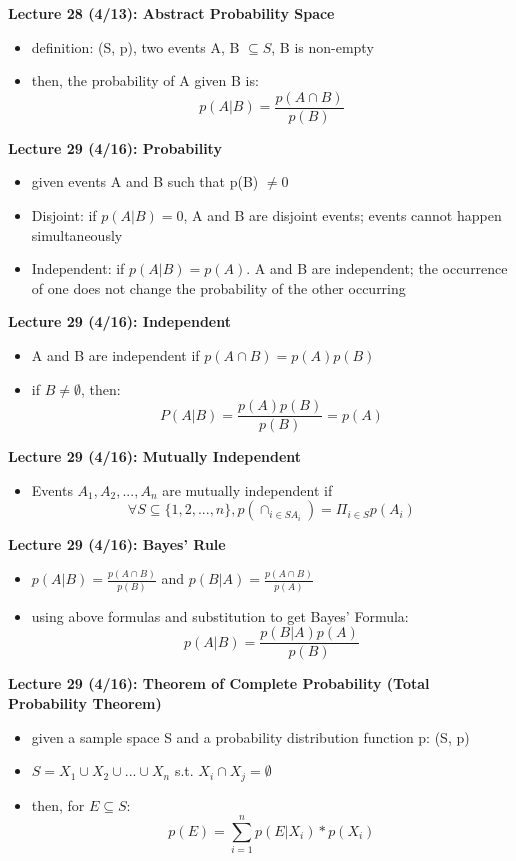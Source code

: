 \documentclass[twocolumn]{article}
\begin{document}
\textbf{Lecture 28 (4/13): Abstract Probability Space}
\begin{itemize}
    \item definition: (S, p), two events A, B $\subseteq S$, B is non-empty
    \item then, the probability of A given B is: 
    $$p(A | B) = \frac{p(A\cap B)}{p(B)}$$
\end{itemize}

\textbf{Lecture 29 (4/16): Probability}
\begin{itemize}
    \item given events A and B such that p(B) $\neq 0$
    \item Disjoint: if $p(A|B)=0$, A and B are disjoint events; events cannot happen simultaneously
    \item Independent: if $p(A|B)=p(A)$. A and B are independent; the occurrence of one does not change the probability of the other occurring
\end{itemize}

\textbf{Lecture 29 (4/16): Independent}
\begin{itemize}
    \item A and B are independent if $p(A \cap B) = p(A)p(B)$
    \item if $B \neq \emptyset$, then:
    $$P(A | B) = \frac{p(A)p(B)}{p(B)}=p(A)$$
\end{itemize}

\textbf{Lecture 29 (4/16): Mutually Independent}
\begin{itemize}
    \item Events $A_1, A_2, ..., A_n$ are mutually independent if $$\forall S\subseteq \{ 1, 2, ..., n\}, p(\cap_{i \in S A_i})=\Pi_{i \in S}p(A_i)$$
\end{itemize}

\textbf{Lecture 29 (4/16): Bayes' Rule}
\begin{itemize}
    \item $p(A|B) = \frac{p(A\cap B)}{p(B)}$ and $p(B|A) = \frac{p(A\cap B)}{p(A)}$
    \item using above formulas and substitution to get Bayes' Formula:
    $$p(A | B) = \frac{p(B|A)p(A)}{p(B)}$$
\end{itemize}

\textbf{Lecture 29 (4/16): Theorem of Complete Probability (Total Probability Theorem)}
\begin{itemize}
    \item given a sample space S and a probability distribution function p: (S, p)
    \item $S = X_1 \cup X_2 \cup ... \cup X_n$ s.t. $X_i \cap X_j = \emptyset$
    \item then, for $E \subseteq S$:
    $$p(E) = \sum_{i=1}^n p(E | X_i)*p(X_i)$$
\end{itemize}
\end{document}
